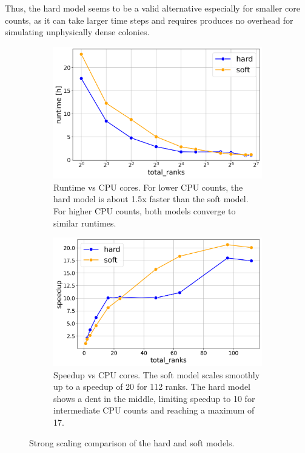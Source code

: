 \documentclass[conference]{IEEEtran}
\begin{document}
Thus, the hard model seems to be a valid alternative especially for smaller core counts, as it can take larger time steps and requires produces no overhead for simulating unphysically dense colonies.


\begin{figure}[H]
    \centering
    \begin{subfigure}[b]{1\linewidth}
        \includegraphics[width=\linewidth]{figures/runtimes/strong_scaling_hard_soft.png}
        \caption{Runtime vs CPU cores. For lower CPU counts, the hard model is about 1.5x faster than the soft model. For higher CPU counts, both models converge to similar runtimes.}
        \label{fig:runtime_hard_soft}
    \end{subfigure}

    \vspace{0.5cm}  %

    \begin{subfigure}[b]{1\linewidth}
        \includegraphics[width=\linewidth]{figures/runtimes/strong_scaling_efficiency_hard_soft.png}
        \caption{Speedup vs CPU cores. The soft model scales smoothly up to a speedup of 20 for 112 ranks. The hard model shows a dent in the middle, limiting speedup to 10 for intermediate CPU counts and reaching a maximum of 17.}
        \label{fig:speedup_hard_soft}
    \end{subfigure}

    \caption{Strong scaling comparison of the hard and soft models.}
\end{figure}
\end{document}
